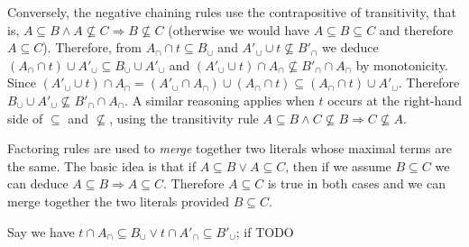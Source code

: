 \documentclass{article}
\begin{document}
Conversely, the negative chaining rules use the contrapositive of transitivity,
that is, $A \subseteq B \land A \not\subseteq C \Rightarrow B \not\subseteq C$
(otherwise we would have $A \subseteq B \subseteq C$ and therefore $A \subseteq C$).
Therefore, from $A_\cap \cap t \subseteq B_\cup$ and
$A'_\cup \cup t \not\subseteq B'_\cap$ we
deduce $(A_\cap\cap t)\cup A'_\cup \subseteq B_\cup\cup A'_\cup$
and $(A'_\cup\cup t) \cap A_\cap \not\subseteq B'_\cap\cap A_\cap$ by monotonicity.
Since $(A'_\cup \cup t)\cap A_\cap
    = (A'_\cup \cap A_\cap)\cup (A_\cap\cap t)
    \subseteq (A_\cap\cap t) \cup A'_\cup$.
Therefore $B_\cup\cup A'_\cup \not\subseteq B'_\cap\cap A_\cap$.
A similar reasoning applies when $t$ occurs at the right-hand side of
$\subseteq$ and $\not\subseteq$, using the transitivity rule
$A \subseteq B \land C \not\subseteq B \Rightarrow C \not\subseteq A$.

Factoring rules are used to \emph{merge} together two literals whose maximal
terms are the same. The basic idea is that if $A \subseteq B
\lor A \subseteq C$, then if we assume $B\subseteq C$ we can deduce
$A \subseteq B \Rightarrow A \subseteq C$. Therefore $A\subseteq C$ is true
in both cases and we can merge together the two literals provided $B\subseteq C$.

Say we have
$t \cap A_\cap \subseteq B_\cup \lor t \cap A'_\cap \subseteq B'_\cup$; if
TODO %
\end{document}
